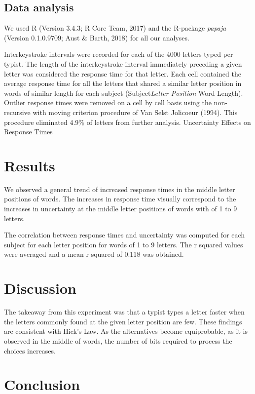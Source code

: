 \documentclass[man]{apa6}
\theoremstyle{definition}
\theoremstyle{definition}
\theoremstyle{definition}
\theoremstyle{remark}
\begin{document}
\subsection{Data analysis}\label{data-analysis}

We used R (Version 3.4.3; R Core Team, 2017) and the R-package
\emph{papaja} (Version 0.1.0.9709; Aust \& Barth, 2018) for all our
analyses.

Interkeystroke intervals were recorded for each of the 4000 letters
typed per typist. The length of the interkeystroke interval immediately
preceding a given letter was considered the response time for that
letter. Each cell contained the average response time for all the
letters that shared a similar letter position in words of similar length
for each subject (Subject\emph{Letter Position } Word Length).\\
Outlier response times were removed on a cell by cell basis using the
non-recursive with moving criterion procedure of Van Selst Jolicoeur
(1994). This procedure eliminated 4.9\% of letters from further
analysis. Uncertainty Effects on Response Times

\section{Results}\label{results}

We observed a general trend of increased response times in the middle
letter positions of words. The increases in response time visually
correspond to the increases in uncertainty at the middle letter
positions of words with of 1 to 9 letters.

The correlation between response times and uncertainty was computed for
each subject for each letter position for words of 1 to 9 letters. The r
squared values were averaged and a mean r squared of 0.118 was obtained.

\section{Discussion}\label{discussion}

The takeaway from this experiment was that a typist types a letter
faster when the letters commonly found at the given letter position are
few. These findings are consistent with Hick's Law. As the alternatives
become equiprobable, as it is observed in the middle of words, the
number of bits required to process the choices increases.

\section{Conclusion}\label{conclusion}
\end{document}
